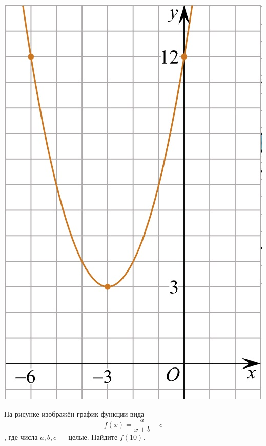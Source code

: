 \begin{homework}[number=1]
\begin{listofex}
\begin{minipage}[t]{0.22\textwidth}
			\includegraphics[align=t, width=\textwidth]{pics/G101M4C4-5.jpg}
		\end{minipage}
		\item
		\begin{minipage}[t]{0.66\textwidth}
			На рисунке изображён график функции вида \[ f(x)=\dfrac{a}{x+b}+c \], где числа \(a, b, c\) --- целые. Найдите \(f(10)\).
		\end{minipage}
		\hspace{0.05\textwidth}
		\begin{minipage}[t]{0.22\textwidth}

\end{minipage}
\end{listofex}
\end{homework}
